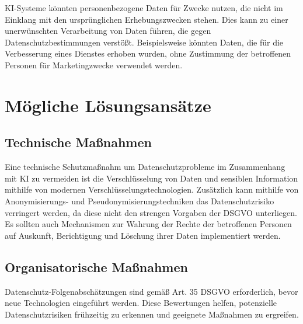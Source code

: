 KI-Systeme könnten personenbezogene Daten für Zwecke nutzen, die nicht im
Einklang mit den ursprünglichen Erhebungszwecken stehen. Dies kann zu einer
unerwünschten Verarbeitung von Daten führen, die gegen Datenschutzbestimmungen
verstößt. Beispielsweise könnten Daten, die für die Verbesserung eines Dienstes
erhoben wurden, ohne Zustimmung der betroffenen Personen für Marketingzwecke
verwendet werden.


\section{Mögliche Lösungsansätze}

\subsection{Technische Maßnahmen}


Eine technische Schutzmaßnahm um Datenschutzprobleme im Zusammenhang mit KI zu
vermeiden ist die Verschlüsselung von Daten und sensiblen Information mithilfe
von modernen Verschlüsselungstechnologien. Zusätzlich kann mithilfe von
Anonymisierungs- und Pseudonymisierungstechniken das Datenschutzrisiko
verringert werden, da diese nicht den strengen Vorgaben der DSGVO unterliegen.
Es sollten auch Mechanismen zur Wahrung der Rechte der betroffenen Personen auf
Auskunft, Berichtigung und Löschung ihrer Daten implementiert werden.

\cite{conrad_2017}

\subsection{Organisatorische Maßnahmen}

Datenschutz-Folgenabschätzungen sind gemäß Art. 35 DSGVO erforderlich,
bevor neue Technologien eingeführt werden. Diese Bewertungen helfen, potenzielle
Datenschutzrisiken frühzeitig zu erkennen und geeignete Maßnahmen zu ergreifen.

